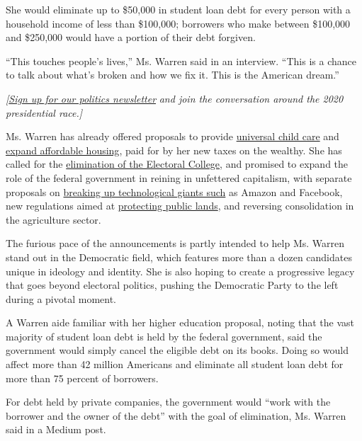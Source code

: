 She would eliminate up to \$50,000 in student loan debt for every person
with a household income of less than \$100,000; borrowers who make
between \$100,000 and \$250,000 would have a portion of their debt
forgiven.

``This touches people's lives,'' Ms. Warren said in an interview. ``This
is a chance to talk about what's broken and how we fix it. This is the
American dream.''

\emph{{[}}\href{https://www.nytimes3xbfgragh.onion/newsletters/politics?smid=rd?action=click\&module=Intentional\&pgtype=Article}{\emph{Sign
up for our politics newsletter}} \emph{and join the conversation around
the 2020 presidential race.{]}}

Ms. Warren has already offered proposals to provide
\href{https://www.nytimes3xbfgragh.onion/2019/02/19/us/politics/elizabeth-warren-child-care.html}{universal
child care} and
\href{https://www.theroot.com/sen-elizabeth-warren-breaks-down-america-s-ugly-histor-1829439424}{expand
affordable housing}, paid for by her new taxes on the wealthy. She has
called for the
\href{https://www.nytimes3xbfgragh.onion/2019/03/18/us/politics/elizabeth-warren-town-hall-electoral-college.html}{elimination
of the Electoral College}, and promised to expand the role of the
federal government in reining in unfettered capitalism, with separate
proposals on
\href{https://www.nytimes3xbfgragh.onion/2019/03/08/us/politics/elizabeth-warren-amazon.html}{breaking
up technological giants such} as Amazon and Facebook, new regulations
aimed at
\href{https://www.nytimes3xbfgragh.onion/2019/04/15/us/politics/elizabeth-warren-public-lands.html}{protecting
public lands}, and reversing consolidation in the agriculture sector.

The furious pace of the announcements is partly intended to help Ms.
Warren stand out in the Democratic field, which features more than a
dozen candidates unique in ideology and identity. She is also hoping to
create a progressive legacy that goes beyond electoral politics, pushing
the Democratic Party to the left during a pivotal moment.

A Warren aide familiar with her higher education proposal, noting that
the vast majority of student loan debt is held by the federal
government, said the government would simply cancel the eligible debt on
its books. Doing so would affect more than 42 million Americans and
eliminate all student loan debt for more than 75 percent of borrowers.

For debt held by private companies, the government would ``work with the
borrower and the owner of the debt'' with the goal of elimination, Ms.
Warren said in a Medium post.

